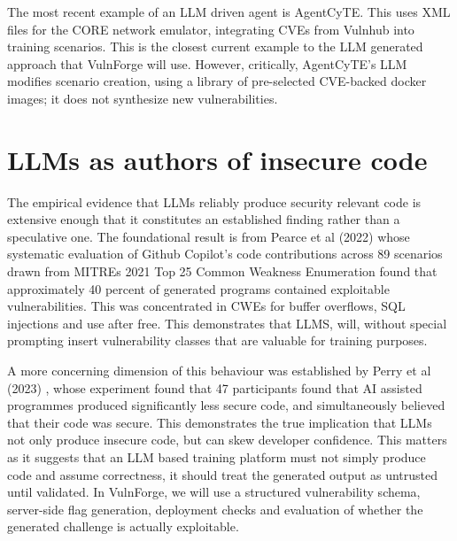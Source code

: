 The most recent example of an LLM driven agent is AgentCyTE\cite{rodriguez_agentcyte_2025}. This uses XML files for the CORE network emulator, integrating CVEs from Vulnhub into training scenarios. This is the closest current example to the LLM generated approach that VulnForge will use. However, critically, AgentCyTE's LLM modifies scenario creation, using a library of pre-selected CVE-backed docker images; it does not synthesize new vulnerabilities. 

\section{LLMs as authors of insecure code}\label{sec:LLMs}
The empirical evidence that LLMs reliably produce security relevant code is extensive enough that it constitutes an established finding rather than a speculative one. The foundational result is from Pearce et al (2022)\cite{pearce_asleep_2021} whose systematic evaluation of Github Copilot's code contributions across 89 scenarios drawn from MITREs 2021 Top 25 Common Weakness Enumeration found that approximately 40 percent of generated programs contained exploitable vulnerabilities. This was concentrated in CWEs for buffer overflows, SQL injections and use after free. This demonstrates that LLMS, will, without special prompting insert vulnerability classes that are valuable for training purposes.  

A more concerning dimension of this behaviour was established by Perry et al (2023) \cite{perry_users_2023}, whose experiment found that 47 participants found that AI assisted programmes produced significantly less secure code, and simultaneously believed that their code was secure. This demonstrates the true implication that LLMs not only produce insecure code, but can skew developer confidence. This matters as it suggests that an LLM based training platform must not simply produce code and assume correctness, it should treat the generated output as untrusted until validated. In VulnForge, we will use a structured vulnerability schema, server-side flag generation, deployment checks and evaluation of whether the generated challenge is actually exploitable. 

